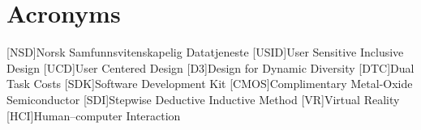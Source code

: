 \chapter*{Acronyms}
\begin{acronym}
[NSD]{Norsk Samfunnsvitenskapelig Datatjeneste}
[USID]{User Sensitive Inclusive Design}
[UCD]{User Centered Design}
[D3]{Design for Dynamic Diversity}
[DTC]{Dual Task Costs}
[SDK]{Software Development Kit}
[CMOS]{Complimentary Metal-Oxide Semiconductor}
[SDI]{Stepwise Deductive Inductive Method}
[VR]{Virtual Reality}
[HCI]{Human–computer Interaction}

\end{acronym}